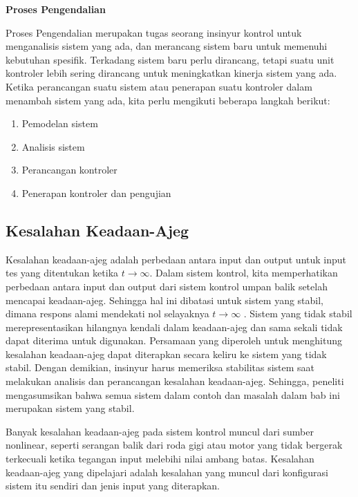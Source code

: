 \noindent	\textbf{Proses Pengendalian}

Proses Pengendalian merupakan tugas seorang insinyur kontrol untuk menganalisis sistem yang ada, dan merancang sistem baru untuk memenuhi kebutuhan spesifik. Terkadang sistem baru perlu dirancang, tetapi suatu unit kontroler lebih sering dirancang untuk meningkatkan kinerja sistem yang ada. Ketika perancangan suatu sistem atau penerapan suatu kontroler dalam menambah sistem yang ada, kita perlu mengikuti beberapa langkah berikut:

\begin{enumerate}
	\item Pemodelan sistem
	\item Analisis sistem
	\item Perancangan kontroler
	\item Penerapan kontroler dan pengujian
\end{enumerate}

\subsection{Kesalahan Keadaan-Ajeg}

Kesalahan keadaan-ajeg adalah perbedaan antara input dan output untuk input tes yang ditentukan ketika $t \rightarrow \infty$. Dalam sistem kontrol, kita memperhatikan perbedaan antara input dan output dari sistem kontrol umpan balik setelah mencapai keadaan-ajeg. Sehingga hal ini dibatasi untuk sistem yang stabil, dimana respons alami mendekati nol selayaknya $t \rightarrow \infty$ . Sistem yang tidak stabil merepresentasikan hilangnya kendali dalam keadaan-ajeg dan sama sekali tidak dapat diterima untuk digunakan. Persamaan yang diperoleh untuk menghitung kesalahan keadaan-ajeg dapat diterapkan secara keliru ke sistem yang tidak stabil. Dengan demikian, insinyur harus memeriksa stabilitas sistem saat melakukan analisis dan perancangan kesalahan keadaan-ajeg. Sehingga, peneliti mengasumsikan bahwa semua sistem dalam contoh dan masalah dalam bab ini merupakan sistem yang stabil.

Banyak kesalahan keadaan-ajeg pada sistem kontrol muncul dari sumber nonlinear, seperti serangan balik dari roda gigi atau motor yang tidak bergerak terkecuali ketika tegangan input melebihi nilai ambang batas. Kesalahan keadaan-ajeg yang dipelajari adalah kesalahan yang muncul dari konfigurasi sistem itu sendiri dan jenis input yang diterapkan. 


